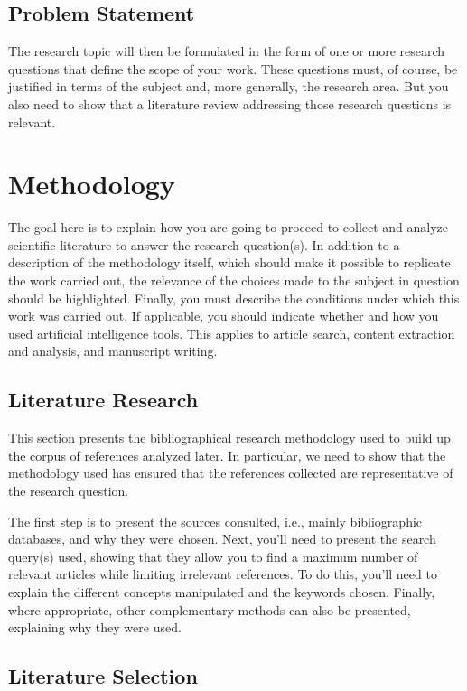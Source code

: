 \subsection{Problem Statement}

The research topic will then be formulated in the form of one or more research questions that define the scope of your work. These questions must, of course, be justified in terms of the subject and, more generally, the research area. But you also need to show that a literature review addressing those research questions is relevant.

\section{Methodology}

The goal here is to explain how you are going to proceed to collect and analyze scientific literature to answer the research question(s).
In addition to a description of the methodology itself, which should make it possible to replicate the work carried out, the relevance of the choices made to the subject in question should be highlighted.
Finally, you must describe the conditions under which this work was carried out. If applicable, you should indicate whether and how you used artificial intelligence tools. This applies to article search, content extraction and analysis, and manuscript writing.

\subsection{Literature Research}

This section presents the bibliographical research methodology used to build up the corpus of references analyzed later.
In particular, we need to show that the methodology used has ensured that the references collected are representative of the research question.

The first step is to present the sources consulted, i.e., mainly bibliographic databases, and why they were chosen. 
Next, you'll need to present the search query(s) used, showing that they allow you to find a maximum number of relevant articles while limiting irrelevant references. To do this, you'll need to explain the different concepts manipulated and the keywords chosen.
Finally, where appropriate, other complementary methods can also be presented, explaining why they were used.

\subsection{Literature Selection}

